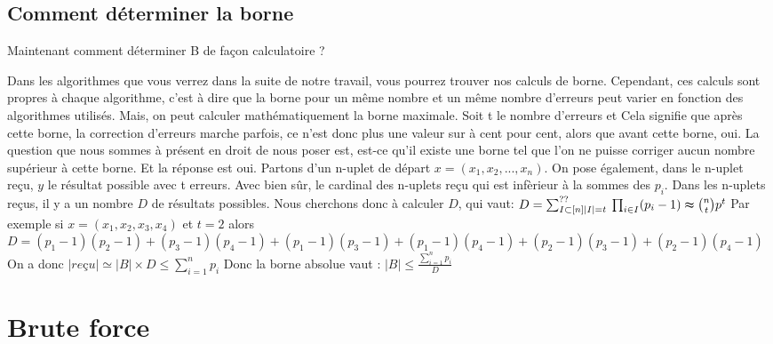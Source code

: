 \documentclass[a4paper, 11pt]{report}
\begin{document}
\newpage

\section{Comment déterminer la borne}


Maintenant comment déterminer B de façon calculatoire ? \newline

Dans les algorithmes que vous verrez dans la suite de notre travail, vous pourrez trouver nos calculs de borne. Cependant, ces calculs sont propres à chaque algorithme,
c'est à dire que la borne pour un même nombre et un même nombre d'erreurs peut varier en fonction des algorithmes utilisés. \newline
Mais, on peut calculer mathématiquement la borne maximale. \newline
Soit t le nombre d'erreurs et 
Cela signifie que après cette borne, la correction d'erreurs marche parfois, ce n'est donc plus une valeur sur à cent pour cent, alors que avant cette borne, oui.
\newline
La question que nous sommes à présent en droit de nous poser est, est-ce qu'il existe une borne tel que l'on ne puisse corriger aucun nombre supérieur à cette borne. Et la réponse est oui.
Partons d'un n-uplet de départ $x=(x_1, x_2, ..., x_n)$. On pose également, dans le n-uplet reçu, $y$ le résultat possible avec t erreurs. Avec bien sûr, le cardinal des n-uplets reçu qui est infèrieur à la sommes des $p_i$. Dans les n-uplets reçus, il y a un nombre $D$ de résultats possibles. Nous cherchons donc à calculer $D$, qui vaut: \newline
$D=\sum_{I\subset \left[n\right]  \newline \left\lvert I\right\rvert=t  }^{??} \: \prod _{i \in I} (p_i - 1) \thickapprox \binom{n}{t} p^t  $ 
Par exemple si $x=(x_1, x_2, x_3, x_4)$ et $t=2$ alors $D=(p_1-1)(p_2-1)+(p_3-1)(p_4-1)+(p_1-1)(p_3-1)+(p_1-1)(p_4-1)+(p_2-1)(p_3-1)+(p_2-1)(p_4-1)$ \newline
On a donc $\left\lvert reçu\right\rvert \simeq \left\lvert B\right\rvert \times D\leq \sum_{i = 1}^{n} p_i  $ \newline
Donc la borne absolue vaut : $\left\lvert B\right\rvert \leq  \frac{\sum_{i= 1}^{n} p_i }{D}  $

\newpage

\chapter{Brute force}
\end{document}
